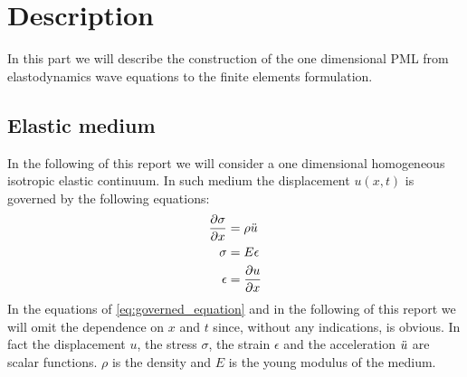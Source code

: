 \section{Description}
\label{part:describ}
In this part we will describe the construction of the one dimensional PML from elastodynamics wave equations to the finite elements formulation.
\subsection{Elastic medium}
In the following of this report we will consider a one dimensional homogeneous isotropic elastic continuum. In such medium the displacement $u(x,t)$ is governed by the following equations:
\begin{equation}
  \begin{aligned}
    \frac{\partial \sigma}{\partial x} &= \rho \Ddot{u}\\        
    \sigma &= E \epsilon \\
    \epsilon &= \frac{\partial u}{\partial x}
  \end{aligned}
  \label{eq:governed_equation}
\end{equation}
In the equations of \ref{eq:governed_equation} and in the following of this report we will omit the dependence on $x$ and $t$ since, without any indications, is obvious. In fact the displacement $u$, the stress $\sigma$, the strain $\epsilon$ and the acceleration $\Ddot{u}$ are scalar functions. $\rho$ is the density and $E$ is the young modulus of the medium. 
